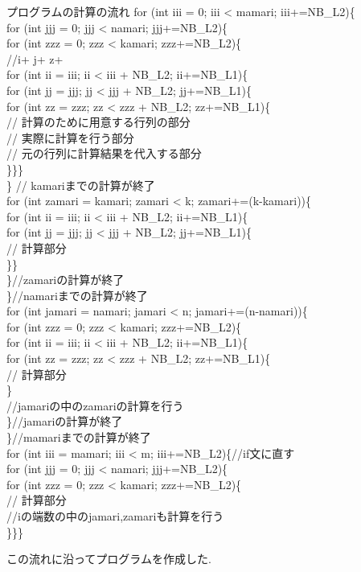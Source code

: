 \documentclass[11pt,a4paper]{jsreport}
\theoremstyle{definition}
\begin{document}
\begin{itembox}[l]{プログラムの計算の流れ}
for (int iii = 0; iii < mamari; iii+=NB\_L2)\{  \\
    for (int jjj = 0; jjj < namari; jjj+=NB\_L2)\{ \\
    for (int zzz = 0; zzz < kamari; zzz+=NB\_L2)\{ \\
        //i+ j+ z+ \\
        for (int ii = iii; ii < iii + NB\_L2; ii+=NB\_L1)\{ \\
        for (int jj = jjj; jj < jjj + NB\_L2; jj+=NB\_L1)\{ \\
        for (int zz = zzz; zz < zzz + NB\_L2; zz+=NB\_L1)\{ \\
        // 計算のために用意する行列の部分 \\
        // 実際に計算を行う部分 \\
        // 元の行列に計算結果を代入する部分 \\
        \}\}\} \\
        \} // kamariまでの計算が終了 \\
        for (int zamari = kamari; zamari < k; zamari+=(k-kamari))\{ \\
        for (int ii = iii; ii < iii + NB\_L2; ii+=NB\_L1)\{ \\
        for (int jj = jjj; jj < jjj + NB\_L2; jj+=NB\_L1)\{ \\
        // 計算部分 \\
        \}\} \\
        \}//zamariの計算が終了 \\
        \}//namariまでの計算が終了 \\
         for (int jamari = namari; jamari < n; jamari+=(n-namari))\{ \\
    	for (int zzz = 0; zzz < kamari; zzz+=NB\_L2)\{ \\
        for (int ii = iii; ii < iii + NB\_L2; ii+=NB_L1)\{ \\
        for (int zz = zzz; zz < zzz + NB\_L2; zz+=NB\_L1)\{ \\
        // 計算部分 \\
        \} \\
        //jamariの中のzamariの計算を行う \\
        \}//jamariの計算が終了 \\
        \}//mamariまでの計算が終了 \\
        for (int iii = mamari; iii < m; iii+=NB\_L2)\{//if文に直す \\
    	for (int jjj = 0; jjj < namari; jjj+=NB\_L2)\{  \\
    	for (int zzz = 0; zzz < kamari; zzz+=NB\_L2)\{ \\
    	// 計算部分 \\
    	//iの端数の中のjamari,zamariも計算を行う \\
    \}\}\}
\end{itembox}
この流れに沿ってプログラムを作成した.
\newpage
\end{document}
